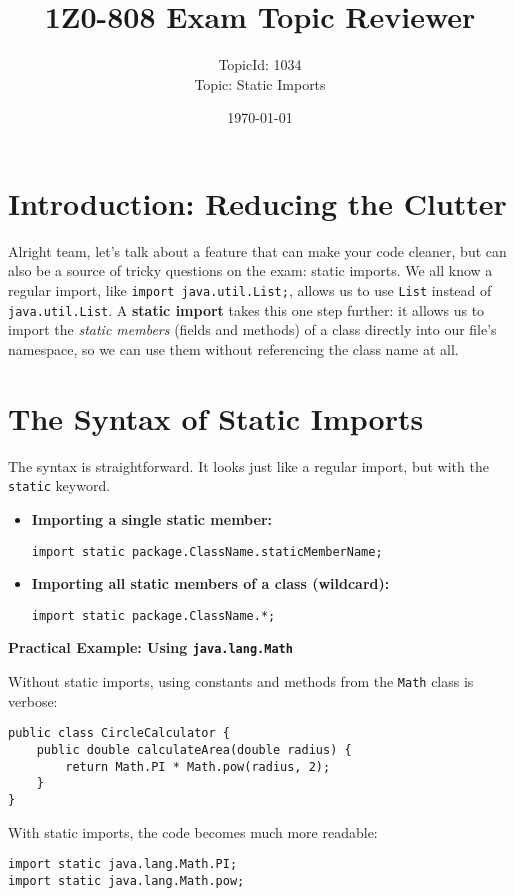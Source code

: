 \documentclass[12pt]{article}
\title{\textbf{1Z0-808 Exam Topic Reviewer}}
\author{TopicId: 1034 \\ Topic: Static Imports}
\date{\today}
\begin{document}
\maketitle
\newpage\begin{enumerate}[label=(\arabic*)]
\section*{Introduction: Reducing the Clutter}
Alright team, let's talk about a feature that can make your code cleaner, but can also be a source of tricky questions on the exam: static imports. We all know a regular import, like \texttt{import java.util.List;}, allows us to use \texttt{List} instead of \texttt{java.util.List}. A \textbf{static import} takes this one step further: it allows us to import the \textit{static members} (fields and methods) of a class directly into our file's namespace, so we can use them without referencing the class name at all.

\section{The Syntax of Static Imports}
The syntax is straightforward. It looks just like a regular import, but with the \texttt{static} keyword.

\begin{itemize}
    \item \textbf{Importing a single static member:}
    \begin{verbatim}
import static package.ClassName.staticMemberName;
    \end{verbatim}

    \item \textbf{Importing all static members of a class (wildcard):}
    \begin{verbatim}
import static package.ClassName.*;
    \end{verbatim}
\end{itemize}

\textbf{Practical Example: Using \texttt{java.lang.Math}}

Without static imports, using constants and methods from the \texttt{Math} class is verbose:
\begin{verbatim}
public class CircleCalculator {
    public double calculateArea(double radius) {
        return Math.PI * Math.pow(radius, 2);
    }
}
\end{verbatim}

With static imports, the code becomes much more readable:
\begin{verbatim}
import static java.lang.Math.PI;
import static java.lang.Math.pow;


\end{verbatim}
\end{enumerate}
\end{document}
